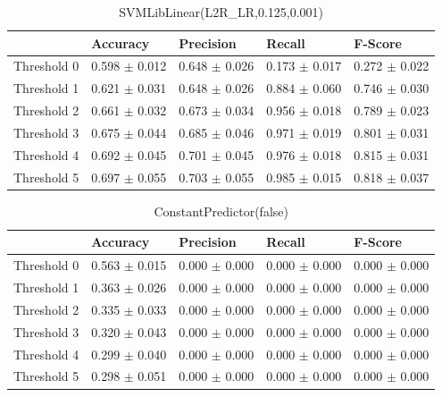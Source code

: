 \clearpage
\begin{table}[h]
	\centering
	\begin{tabular}{|l|l|l|l|l|} %
	\hline
	& Accuracy & Precision & Recall & F-Score \\ \hline
	Threshold 0 & 0.598	\( \pm \) 0.012	& 0.648	\( \pm \) 0.026	& 0.173	\( \pm \) 0.017	& 0.272	\( \pm \) 0.022	\\ \hline
	Threshold 1 & 0.621	\( \pm \) 0.031	& 0.648	\( \pm \) 0.026	& 0.884	\( \pm \) 0.060	& 0.746	\( \pm \) 0.030	\\ \hline
	Threshold 2 & 0.661	\( \pm \) 0.032	& 0.673	\( \pm \) 0.034	& 0.956	\( \pm \) 0.018	& 0.789	\( \pm \) 0.023	\\ \hline
	Threshold 3 & 0.675	\( \pm \) 0.044	& 0.685	\( \pm \) 0.046	& 0.971	\( \pm \) 0.019	& 0.801	\( \pm \) 0.031	\\ \hline
	Threshold 4 & 0.692	\( \pm \) 0.045	& 0.701	\( \pm \) 0.045	& 0.976	\( \pm \) 0.018	& 0.815	\( \pm \) 0.031	\\ \hline
	Threshold 5 & 0.697	\( \pm \) 0.055	& 0.703	\( \pm \) 0.055	& 0.985	\( \pm \) 0.015	& 0.818	\( \pm \) 0.037	\\ \hline
	\end{tabular}
	\caption{SVMLibLinear(L2R\_LR,0.125,0.001)}
	\label{tab:revpol}
\end{table}
\begin{table}[h]
	\centering
	\begin{tabular}{|l|l|l|l|l|} %
	\hline
	& Accuracy & Precision & Recall & F-Score \\ \hline
	Threshold 0 & 0.563	\( \pm \) 0.015	& 0.000 \( \pm \) 0.000 & 0.000	\( \pm \) 0.000	& 0.000 \( \pm \) 0.000 \\ \hline
	Threshold 1 & 0.363	\( \pm \) 0.026	& 0.000 \( \pm \) 0.000 & 0.000	\( \pm \) 0.000	& 0.000 \( \pm \) 0.000 \\ \hline
	Threshold 2 & 0.335	\( \pm \) 0.033	& 0.000 \( \pm \) 0.000 & 0.000	\( \pm \) 0.000	& 0.000 \( \pm \) 0.000 \\ \hline
	Threshold 3 & 0.320	\( \pm \) 0.043	& 0.000 \( \pm \) 0.000 & 0.000	\( \pm \) 0.000	& 0.000 \( \pm \) 0.000 \\ \hline
	Threshold 4 & 0.299	\( \pm \) 0.040	& 0.000 \( \pm \) 0.000 & 0.000	\( \pm \) 0.000	& 0.000 \( \pm \) 0.000 \\ \hline
	Threshold 5 & 0.298	\( \pm \) 0.051	& 0.000 \( \pm \) 0.000 & 0.000	\( \pm \) 0.000	& 0.000 \( \pm \) 0.000 \\ \hline
	\end{tabular}
	\caption{ConstantPredictor(false)}
	\label{tab:revpol}
\end{table}
